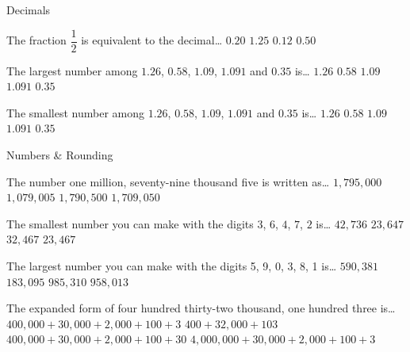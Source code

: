 \documentclass[dvips]{jj_game} %
\begin{document}
\begin{Questions}
\begin{Category}{Decimals}
\begin{Question}

The fraction $\dfrac{1}{2}$ is equivalent to the
decimal\dots
{} $0.20$
 $1.25$
 $0.12$
 $0.50$
\end{Question}


\begin{Question}

The largest number among $1.26$, $0.58$, $1.09$, $1.091$ and $0.35$
is\dots
{} $1.26$
 $0.58$
 $1.09$
 $1.091$
 $0.35$
\end{Question}


\begin{Question}

The smallest number among $1.26$, $0.58$, $1.09$, $1.091$ and $0.35$
is\dots
{} $1.26$
 $0.58$
 $1.09$
 $1.091$
 $0.35$
\end{Question}

\end{Category}


\begin{Category}{Numbers \& Rounding}

\begin{Question}

The number one million, seventy-nine thousand five is written
as\dots
{} $1{,}795{,}000$
 $1{,}079{,}005$
 $1{,}790{,}500$
 $1{,}709{,}050$
\end{Question}

\begin{Question}

The smallest number you can make with the digits $3$, $6$, $4$, $7$,
$2$ is\dots
{} $42{,}736$
 $23{,}647$
 $32{,}467$
 $23{,}467$
\end{Question}

\begin{Question}

The largest number you can make with the digits 5, 9, 0, 3, 8, 1 is\dots
{} $590{,}381$
 $183{,}095$
 $985{,}310$
 $958{,}013$
\end{Question}

\begin{Question}

The expanded form of four hundred thirty-two thousand, one
hundred three is\dots
{} $400{,}000+30{,}000+2{,}000+100+3$
 $400+32{,}000+103$
 $400{,}000+30,000+2{,}000+100+30$
 $4{,}000{,}000+30{,}000+2{,}000+100+3$
\end{Question}


\end{Category}
\end{Questions}
\end{document}
